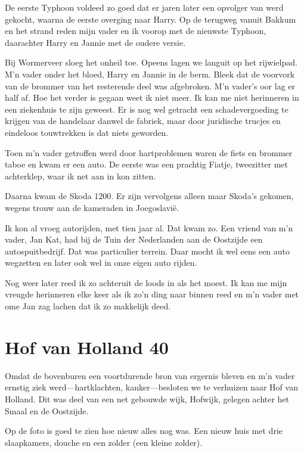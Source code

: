 \documentclass[12pt,twoside, openright]{memoir}
\begin{document}
De eerste Typhoon voldeed zo goed dat er jaren later een opvolger van werd gekocht, waarna de eerste overging naar Harry. Op de terugweg vanuit Bakkum en het strand reden mijn vader en ik voorop met de nieuwste Typhoon, daarachter Harry en Jannie met de oudere versie. 

Bij Wormerveer sloeg het onheil toe. Opeens lagen we languit op het rijwielpad. M'n vader onder het bloed, Harry en Jannie in de berm. Bleek dat de voorvork van de brommer van het resterende deel was afgebroken. M'n vader's oor lag er half af. Hoe het verder is gegaan weet ik niet meer. Ik kan me niet herinneren in een ziekenhuis te zijn geweest. Er is nog wel getracht een schadevergoeding te krijgen van de handelaar danwel de fabriek, maar door juridische trucjes en eindeloos touwtrekken is dat niets geworden. 

Toen m'n vader getroffen werd door hartproblemen waren de fiets en brommer taboe en kwam er een auto. De eerste was een prachtig Fiatje, tweezitter met achterklep, waar ik net aan in kon zitten. 

Daarna kwam de Skoda 1200. Er zijn vervolgens alleen maar Skoda's gekomen, wegens trouw aan de kameraden in Joegoslavië. 

Ik kon al vroeg autorijden, met tien jaar al. Dat kwam zo. Een vriend van m'n vader, Jan Kat, had bij de Tuin der Nederlanden aan de Oostzijde een autospuitbedrijf. Dat was particulier terrein. Daar mocht ik wel eens een auto wegzetten en later ook wel in onze eigen auto rijden. 

Nog weer later reed ik zo achteruit de loods in als het moest. Ik kan me mijn vreugde herinneren elke keer als ik zo'n ding naar binnen reed en m'n vader met ome Jan zag lachen dat ik zo makkelijk deed.

\chapter{Hof van Holland 40} %
\label{cha:hofvanholland}

Omdat de bovenburen een voortdurende bron van ergernis bleven en m’n vader ernstig ziek werd---hartklachten, kanker---besloten we te verhuizen naar Hof van Holland. Dit was deel van een net gebouwde wijk, Hofwijk, gelegen achter het Smaal en de Oostzijde. 

Op de foto is goed te zien hoe nieuw alles nog was. Een nieuw huis met drie slaapkamers, douche en een zolder (een kleine zolder). 
\end{document}
